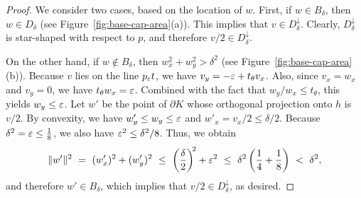 \documentclass[11pt]{article}   \usepackage[letterpaper,hmargin=2.1cm,vmargin=3cm]{geometry}
\newcommand{\inv}[1]{\frac{1}{#1}}
\begin{document}
\begin{proof}
We consider two cases, based on the location of $w$. First, if $w \in B_{\delta}$, then $w \in D_{\delta}$ (see Figure~\ref{fig:base-cap-area}(a)). This implies that $v \in D^{\downarrow}_{\delta}$. Clearly, $D^{\downarrow}_{\delta}$ is star-shaped with respect to $p$, and therefore $v/2 \in D^{\downarrow}_{\delta}$.

On the other hand, if $w \notin B_{\delta}$, then $w_x^2 + w_y^2 > \delta^2$ (see Figure~\ref{fig:base-cap-area}(b)). Because $v$ lies on the line $p_{\varepsilon} t$, we have $v_y = -\varepsilon + t_{\theta} v_x$. Also, since $v_x = w_x$ and $v_y = 0$, we have $t_{\theta} w_x = \varepsilon$. Combined with the fact that $w_y/w_x \le t_{\theta}$, this yields $w_y \le \varepsilon$. Let $w'$ be the point of $\partial K$ whose orthogonal projection onto $h$ is $v/2$. By convexity, we have $w'_y \le w_y \le \varepsilon$ and $w'_x = v_x/2 \le \delta/2$. Because $\delta^2 = \eps \le \inv{8}$, we also have $\varepsilon^2 \le \delta^2/8$. Thus, we obtain
\[
	\|w'\|^2
		~  =  ~ (w'_x)^2 + (w'_y)^2 
		~ \le ~ \left( \frac{\delta}{2} \right)^{\N 2} + \eps^2
		~ \le ~ \delta^2 \left( \inv{4} + \inv{8} \right) 
		~  <  ~ \delta^2,
\]
and therefore $w' \in B_{\delta}$, which implies that $v/2 \in D^{\downarrow}_{\delta}$, as desired.
\end{proof}
\end{document}
